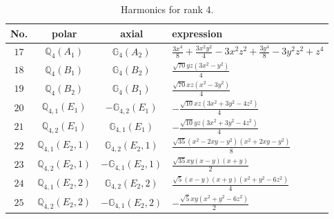 \documentclass[fleqn,8pt,landscape]{jsarticle}
\begin{document}
\begin{table}[ht!]
\begin{center}
\caption{Harmonics for rank 4.}
\renewcommand{\arraystretch}{1.3}
\begin{tabular}{cccl} \hline \hline
No. & polar & axial & expression \\ \hline
$ 17 $ & $ \mathbb{Q}_{4}(A_{1}) $ & $ \mathbb{G}_{4}(A_{2}) $ & $ \frac{3 x^{4}}{8} + \frac{3 x^{2} y^{2}}{4} - 3 x^{2} z^{2} + \frac{3 y^{4}}{8} - 3 y^{2} z^{2} + z^{4} $ \\
$ 18 $ & $ \mathbb{Q}_{4}(B_{1}) $ & $ \mathbb{G}_{4}(B_{2}) $ & $ \frac{\sqrt{70} y z \left(3 x^{2} - y^{2}\right)}{4} $ \\
$ 19 $ & $ \mathbb{Q}_{4}(B_{2}) $ & $ \mathbb{G}_{4}(B_{1}) $ & $ \frac{\sqrt{70} x z \left(x^{2} - 3 y^{2}\right)}{4} $ \\
$ 20 $ & $ \mathbb{Q}_{4,1}(E_{1}) $ & $ -\mathbb{G}_{4,2}(E_{1}) $ & $ - \frac{\sqrt{10} x z \left(3 x^{2} + 3 y^{2} - 4 z^{2}\right)}{4} $ \\
$ 21 $ & $ \mathbb{Q}_{4,2}(E_{1}) $ & $ \mathbb{G}_{4,1}(E_{1}) $ & $ - \frac{\sqrt{10} y z \left(3 x^{2} + 3 y^{2} - 4 z^{2}\right)}{4} $ \\
$ 22 $ & $ \mathbb{Q}_{4,1}(E_{2},1) $ & $ \mathbb{G}_{4,2}(E_{2},1) $ & $ \frac{\sqrt{35} \left(x^{2} - 2 x y - y^{2}\right) \left(x^{2} + 2 x y - y^{2}\right)}{8} $ \\
$ 23 $ & $ \mathbb{Q}_{4,2}(E_{2},1) $ & $ -\mathbb{G}_{4,1}(E_{2},1) $ & $ \frac{\sqrt{35} x y \left(x - y\right) \left(x + y\right)}{2} $ \\
$ 24 $ & $ \mathbb{Q}_{4,1}(E_{2},2) $ & $ \mathbb{G}_{4,2}(E_{2},2) $ & $ \frac{\sqrt{5} \left(x - y\right) \left(x + y\right) \left(x^{2} + y^{2} - 6 z^{2}\right)}{4} $ \\
$ 25 $ & $ \mathbb{Q}_{4,2}(E_{2},2) $ & $ -\mathbb{G}_{4,1}(E_{2},2) $ & $ - \frac{\sqrt{5} x y \left(x^{2} + y^{2} - 6 z^{2}\right)}{2} $ \\
 \hline \hline
\end{tabular}
\end{center}
\end{table}
\end{document}
